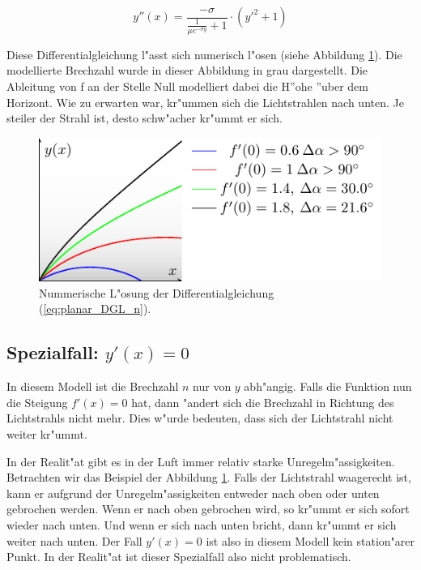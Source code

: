 \begin{refsection}
\begin{equation} \label{eq:planar_DGL_n}
y''(x) = \frac{-\sigma}{\frac{1}{\mu e^{-\sigma y}} + 1} \cdot \left( y'^2 + 1 \right)
\end{equation}

%

Diese Differentialgleichung l"asst sich numerisch l"osen (siehe Abbildung \ref{fig:planares_modell1}).
Die modellierte Brechzahl wurde in dieser Abbildung in grau dargestellt. 
Die Ableitung von f an der Stelle Null modelliert dabei die H''ohe ''uber dem Horizont.
Wie zu erwarten war, kr"ummen sich die Lichtstrahlen nach unten.
Je steiler der Strahl ist, desto schw"acher kr"ummt er sich. 

\begin{figure}
  \centering
  \includegraphics{licht/standalone/fig_planar_simulation.pdf}
  \caption{Nummerische L"osung der Differentialgleichung (\ref{eq:planar_DGL_n}). \label{fig:planares_modell1}}

\end{figure}

\subsection{Spezialfall: $y'(x) = 0$} \label{ch:spezialfall}

In diesem Modell ist die Brechzahl $n$ nur von $y$ abh"angig. 
Falls die Funktion nun die Steigung $f'(x) = 0$ hat, dann "andert sich die Brechzahl in Richtung des Lichtstrahls nicht mehr.
Dies w"urde bedeuten, dass sich der Lichtstrahl nicht weiter kr"ummt. 

In der Realit"at gibt es in der Luft immer relativ starke Unregelm"assigkeiten. 
Betrachten wir das Beispiel der Abbildung \ref{fig:planares_modell1}. 
Falls der Lichtstrahl waagerecht ist, kann er aufgrund der Unregelm"assigkeiten entweder nach oben oder unten gebrochen werden. 
Wenn er nach oben gebrochen wird, so kr"ummt er sich sofort wieder nach unten.
Und wenn er sich nach unten bricht, dann kr"ummt er sich weiter nach unten.  
Der Fall $y'(x) = 0$ ist also in diesem Modell kein station"arer Punkt. 
In der Realit"at ist dieser Spezialfall also nicht problematisch. 


\end{refsection}

